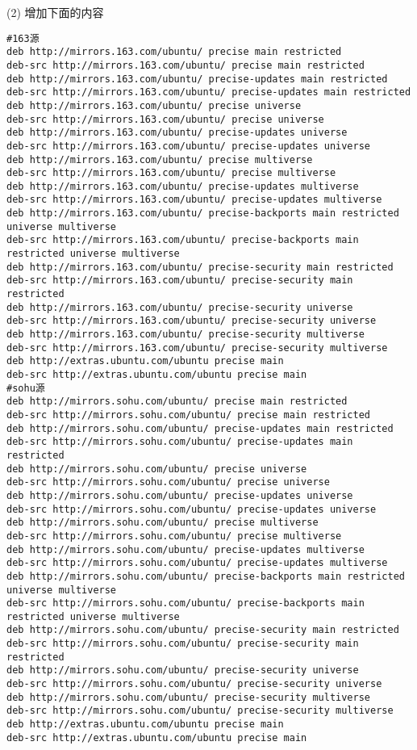 (2) 增加下面的内容
\tiny
\begin{verbatim}
#163源
deb http://mirrors.163.com/ubuntu/ precise main restricted
deb-src http://mirrors.163.com/ubuntu/ precise main restricted
deb http://mirrors.163.com/ubuntu/ precise-updates main restricted
deb-src http://mirrors.163.com/ubuntu/ precise-updates main restricted
deb http://mirrors.163.com/ubuntu/ precise universe
deb-src http://mirrors.163.com/ubuntu/ precise universe
deb http://mirrors.163.com/ubuntu/ precise-updates universe
deb-src http://mirrors.163.com/ubuntu/ precise-updates universe
deb http://mirrors.163.com/ubuntu/ precise multiverse
deb-src http://mirrors.163.com/ubuntu/ precise multiverse
deb http://mirrors.163.com/ubuntu/ precise-updates multiverse
deb-src http://mirrors.163.com/ubuntu/ precise-updates multiverse
deb http://mirrors.163.com/ubuntu/ precise-backports main restricted universe multiverse
deb-src http://mirrors.163.com/ubuntu/ precise-backports main restricted universe multiverse
deb http://mirrors.163.com/ubuntu/ precise-security main restricted
deb-src http://mirrors.163.com/ubuntu/ precise-security main restricted
deb http://mirrors.163.com/ubuntu/ precise-security universe
deb-src http://mirrors.163.com/ubuntu/ precise-security universe
deb http://mirrors.163.com/ubuntu/ precise-security multiverse
deb-src http://mirrors.163.com/ubuntu/ precise-security multiverse
deb http://extras.ubuntu.com/ubuntu precise main
deb-src http://extras.ubuntu.com/ubuntu precise main
#sohu源
deb http://mirrors.sohu.com/ubuntu/ precise main restricted
deb-src http://mirrors.sohu.com/ubuntu/ precise main restricted
deb http://mirrors.sohu.com/ubuntu/ precise-updates main restricted
deb-src http://mirrors.sohu.com/ubuntu/ precise-updates main restricted
deb http://mirrors.sohu.com/ubuntu/ precise universe
deb-src http://mirrors.sohu.com/ubuntu/ precise universe
deb http://mirrors.sohu.com/ubuntu/ precise-updates universe
deb-src http://mirrors.sohu.com/ubuntu/ precise-updates universe
deb http://mirrors.sohu.com/ubuntu/ precise multiverse
deb-src http://mirrors.sohu.com/ubuntu/ precise multiverse
deb http://mirrors.sohu.com/ubuntu/ precise-updates multiverse
deb-src http://mirrors.sohu.com/ubuntu/ precise-updates multiverse
deb http://mirrors.sohu.com/ubuntu/ precise-backports main restricted universe multiverse
deb-src http://mirrors.sohu.com/ubuntu/ precise-backports main restricted universe multiverse
deb http://mirrors.sohu.com/ubuntu/ precise-security main restricted
deb-src http://mirrors.sohu.com/ubuntu/ precise-security main restricted
deb http://mirrors.sohu.com/ubuntu/ precise-security universe
deb-src http://mirrors.sohu.com/ubuntu/ precise-security universe
deb http://mirrors.sohu.com/ubuntu/ precise-security multiverse
deb-src http://mirrors.sohu.com/ubuntu/ precise-security multiverse
deb http://extras.ubuntu.com/ubuntu precise main
deb-src http://extras.ubuntu.com/ubuntu precise main
\end{verbatim}
\normalsize

